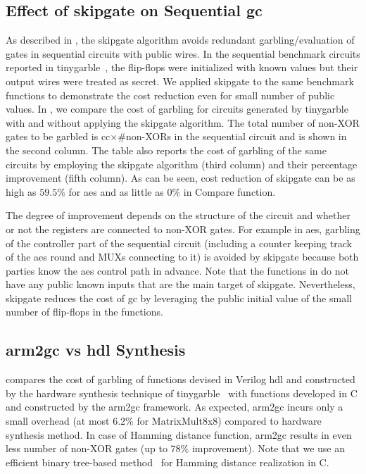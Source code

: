 \subsection{Effect of {\gls{skipgate}} on Sequential \acrshort{gc}}
As described in , the \gls{skipgate} algorithm avoids redundant garbling/evaluation of gates in sequential circuits with public wires.
In the sequential benchmark circuits reported in \gls{tinygarble}~\cite{songhori2015tinygarble}, the flip-flops were initialized with known values but their output wires were treated as secret.
We applied \gls{skipgate} to the same benchmark functions to demonstrate the cost reduction even for small number of public values.
In , we compare the cost of garbling for circuits generated by \gls{tinygarble}~\cite{songhori2015tinygarble} with and without applying the \gls{skipgate} algorithm.
The total number of non-XOR gates to be garbled is cc$\times$\#non-XORs in the sequential circuit and is shown in the second column.
The table also reports the cost of garbling of the same circuits by employing the \gls{skipgate} algorithm (third column) and their percentage improvement (fifth column).
As can be seen, cost reduction of \gls{skipgate} can be as high as $59.5\%$ for \acrshort{aes} and as little as $0\%$ in Compare function.

The degree of improvement depends on the structure of the circuit and whether or not the registers are connected to non-XOR gates.
For example in \acrshort{aes}, garbling of the controller part of the sequential circuit (including a counter keeping track of the \acrshort{aes} round and MUXs connecting to it) is avoided by \gls{skipgate} because both parties know the \acrshort{aes} control path in advance.
Note that the functions in  do not have any public known inputs that are the main target of \gls{skipgate}.
Nevertheless, \gls{skipgate} reduces the cost of \acrshort{gc} by leveraging the public initial value of the small number of flip-flops in the functions.

\subsection{\gls{arm2gc} vs \acrshort{hdl} Synthesis}
 compares the cost of garbling of functions devised in Verilog \acrshort{hdl} and constructed by the hardware synthesis technique of \gls{tinygarble}~\cite{songhori2015tinygarble} with functions developed in C and constructed by the \gls{arm2gc} framework.
As expected, \gls{arm2gc} incurs only a small overhead (at most 6.2\% for MatrixMult8x8) compared to hardware synthesis method.
In case of Hamming distance function, \gls{arm2gc} results in even less number of non-XOR gates (up to $78\%$ improvement).
Note that we use an efficient binary tree-based method~\cite{huang2011faster} for Hamming distance realization in C.

